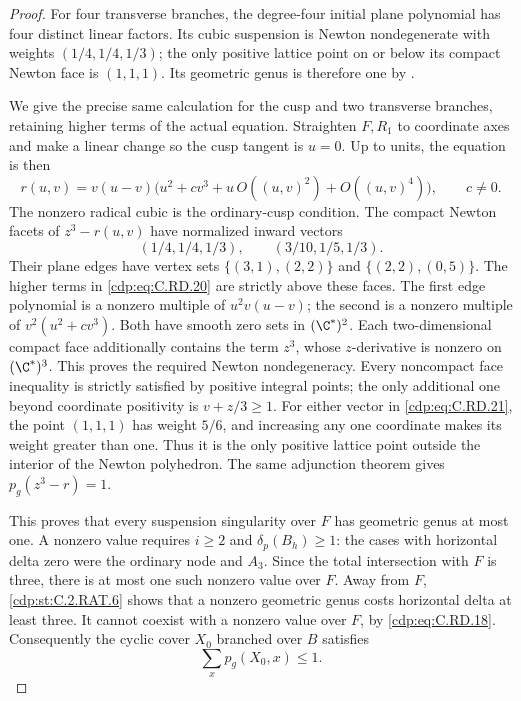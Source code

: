 \begin{proof}
For four transverse branches, the degree-four
initial plane polynomial has four distinct
linear factors. Its cubic suspension is Newton
nondegenerate with weights $(1/4,1/4,1/3)$;
the only positive lattice point on or below
its compact Newton face is $(1,1,1)$. Its
geometric genus is therefore one by
\cite[Theorem 2.1.1 and Corollary 2.1.3]{MerleTeissier1977}.

We give the precise same calculation for the cusp
and two transverse branches, retaining higher
terms of the actual equation. Straighten $F,R_1$
to coordinate axes and make a linear change so
the cusp tangent is $u=0$. Up to units, the
equation is then
\[
 r(u,v)=v(u-v)\bigl(u^2+c v^3+
           u\,O((u,v)^2)+O((u,v)^4)\bigr),
                  \qquad c\ne0.
\tag{C.RD.20}\label{cdp:eq:C.RD.20}
\]
The nonzero radical cubic is the ordinary-cusp
condition. The compact Newton facets of
$z^3-r(u,v)$ have normalized inward vectors
\[
             (1/4,1/4,1/3),\qquad
             (3/10,1/5,1/3).
\tag{C.RD.21}\label{cdp:eq:C.RD.21}
\]
Their plane edges have vertex sets
$\{(3,1),(2,2)\}$ and
$\{(2,2),(0,5)\}$. The higher terms in
\eqref{cdp:eq:C.RD.20} are strictly above these faces.
The first edge polynomial is a nonzero multiple
of $u^2v(u-v)$; the second is a nonzero multiple
of $v^2(u^2+c v^3)$. Both have smooth zero sets
in $(\C^*)^2$. Each two-dimensional compact
face additionally contains the term $z^3$,
whose $z$-derivative is nonzero on $(\C^*)^3$.
This proves the required Newton nondegeneracy.
Every noncompact face inequality is strictly
satisfied by positive integral points; the only
additional one beyond coordinate positivity is
$v+z/3\ge1$.
For either vector in \eqref{cdp:eq:C.RD.21}, the point
$(1,1,1)$ has weight $5/6$, and increasing any
one coordinate makes its weight greater than
one. Thus it is the only positive lattice
point outside the interior of the Newton
polyhedron. The same adjunction theorem gives
$p_g(z^3-r)=1$.

This proves that every suspension singularity
over $F$ has geometric genus at most one.
A nonzero value requires $i\ge2$ and
$\delta_p(B_h)\ge1$: the cases with horizontal
delta zero were the ordinary node and $A_3$.
Since the total intersection with $F$ is three,
there is at most one such nonzero value over
$F$. Away from $F$, \ref{cdp:st:C.2.RAT.6} shows that a
nonzero geometric genus costs horizontal delta
at least three. It cannot coexist with a
nonzero value over $F$, by \eqref{cdp:eq:C.RD.18}.
Consequently the cyclic cover $X_0$ branched
over $B$ satisfies
\[
                        \sum_x p_g(X_0,x)\le1.
\tag{C.RD.22}\label{cdp:eq:C.RD.22}
\]


\end{proof}
